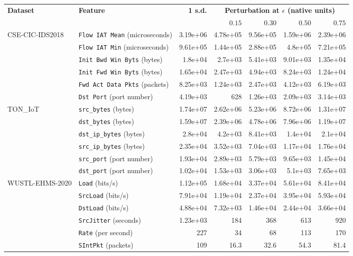 \begin{tabular}{l l r r r r r}
\toprule
\textbf{Dataset} & \textbf{Feature} & \textbf{1 s.d.} & \multicolumn{4}{c}{\textbf{Perturbation at $\epsilon$ (native units)}} \\
\cmidrule(lr){4-7}
 & & & $0.15$ & $0.30$ & $0.50$ & $0.75$ \\
\midrule
CSE-CIC-IDS2018 & \texttt{Flow IAT Mean} (microseconds) & 3.19e+06 & 4.78e+05 & 9.56e+05 & 1.59e+06 & 2.39e+06 \\
 & \texttt{Flow IAT Min} (microseconds) & 9.61e+05 & 1.44e+05 & 2.88e+05 & 4.8e+05 & 7.21e+05 \\
 & \texttt{Init Bwd Win Byts} (bytes) & 1.8e+04 & 2.7e+03 & 5.41e+03 & 9.01e+03 & 1.35e+04 \\
 & \texttt{Init Fwd Win Byts} (bytes) & 1.65e+04 & 2.47e+03 & 4.94e+03 & 8.24e+03 & 1.24e+04 \\
 & \texttt{Fwd Act Data Pkts} (packets) & 8.25e+03 & 1.24e+03 & 2.47e+03 & 4.12e+03 & 6.19e+03 \\
 & \texttt{Dst Port} (port number) & 4.19e+03 & 628 & 1.26e+03 & 2.09e+03 & 3.14e+03 \\
TON\_IoT & \texttt{src\_bytes} (bytes) & 1.74e+07 & 2.62e+06 & 5.23e+06 & 8.72e+06 & 1.31e+07 \\
 & \texttt{dst\_bytes} (bytes) & 1.59e+07 & 2.39e+06 & 4.78e+06 & 7.96e+06 & 1.19e+07 \\
 & \texttt{dst\_ip\_bytes} (bytes) & 2.8e+04 & 4.2e+03 & 8.41e+03 & 1.4e+04 & 2.1e+04 \\
 & \texttt{src\_ip\_bytes} (bytes) & 2.35e+04 & 3.52e+03 & 7.04e+03 & 1.17e+04 & 1.76e+04 \\
 & \texttt{src\_port} (port number) & 1.93e+04 & 2.89e+03 & 5.79e+03 & 9.65e+03 & 1.45e+04 \\
 & \texttt{dst\_port} (port number) & 1.02e+04 & 1.53e+03 & 3.06e+03 & 5.1e+03 & 7.65e+03 \\
WUSTL-EHMS-2020 & \texttt{Load} (bits/s) & 1.12e+05 & 1.68e+04 & 3.37e+04 & 5.61e+04 & 8.41e+04 \\
 & \texttt{SrcLoad} (bits/s) & 7.91e+04 & 1.19e+04 & 2.37e+04 & 3.95e+04 & 5.93e+04 \\
 & \texttt{DstLoad} (bits/s) & 4.88e+04 & 7.32e+03 & 1.46e+04 & 2.44e+04 & 3.66e+04 \\
 & \texttt{SrcJitter} (seconds) & 1.23e+03 & 184 & 368 & 613 & 920 \\
 & \texttt{Rate} (per second) & 227 & 34 & 68 & 113 & 170 \\
 & \texttt{SIntPkt} (packets) & 109 & 16.3 & 32.6 & 54.3 & 81.4 \\
\bottomrule
\end{tabular}